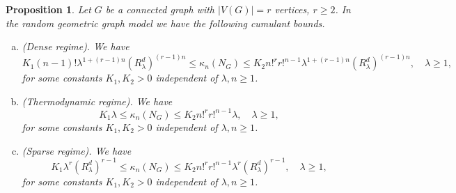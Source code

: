 \documentclass[12pt]{article}
\newtheorem{prop}{Proposition}[section]
\numberwithin{equation}{section}
\begin{document}
\begin{prop}
    \label{thm8}
 Let $G$ be a connected graph with $|V(G)|=r$ vertices, $r\geq 2$.
 In the random geometric graph model we have the following cumulant bounds. 
 \begin{enumerate}[a)]
 \item (Dense regime). 
   We have
   \begin{equation}
     \label{b1}
     K_1 (n-1)! \lambda^{1+(r-1)n} ( R_\lambda^d)^{(r-1)n}
     \leq \kappa_n(N_G) \leq K_2 n!^r r!^{n-1}
 \lambda^{1+(r-1)n} ( R_\lambda^d)^{(r-1)n}, 
 \quad \lambda \geq 1,
   \end{equation}
for some constants $K_1, K_2 > 0$ independent
of $\lambda , n\geq 1$. 
  \item (Thermodynamic regime). 
   We have
   \begin{equation}
\label{b2}
K_1 \lambda \leq \kappa_n(N_G)\leq K_2 n!^r r!^{n-1}\lambda,
  \quad \lambda \geq 1, 
\end{equation}
for some constants $K_1, K_2 > 0$ independent
of $\lambda , n\geq 1$. 
  \item (Sparse regime). 
   We have
   \begin{equation}
 \label{b3}
         K_1 \lambda^r ( R_\lambda^d)^{r-1} 
     \leq \kappa_n(N_G)\leq K_2 n!^r r!^{n-1} \lambda^r (R_\lambda^d)^{r-1},
     \quad \lambda \geq 1,
   \end{equation}
for some constants $K_1, K_2 > 0$ independent
of $\lambda , n\geq 1$. 
 \end{enumerate}
\end{prop}
\end{document}
